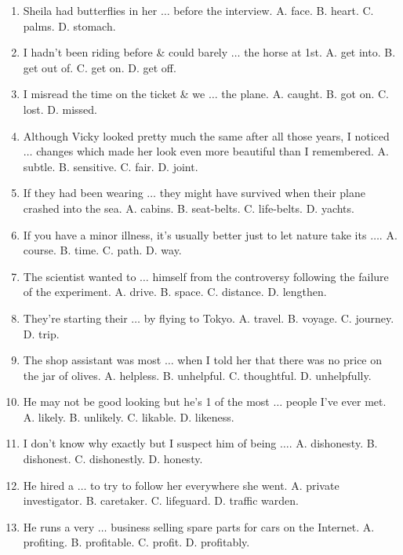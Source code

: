 \documentclass{article}
\numberwithin{equation}{section}
\begin{document}
\begin{enumerate}[leftmargin=8mm]
	\item Sheila had butterflies in her $\ldots$ before the interview. {\sf A.} face. {\sf B.} heart. {\sf C.} palms. {\sf D.} stomach.
	\item I hadn't been riding before \& could barely $\ldots$ the horse at 1st. {\sf A.} get into. {\sf B.} get out of. {\sf C.} get on. {\sf D.} get off.
	\item I misread the time on the ticket \& we $\ldots$ the plane. {\sf A.} caught. {\sf B.} got on. {\sf C.} lost. {\sf D.} missed.
	\item Although Vicky looked pretty much the same after all those years, I noticed $\ldots$ changes which made her look even more beautiful than I remembered. {\sf A.} subtle. {\sf B.} sensitive. {\sf C.} fair. {\sf D.} joint.
	\item If they had been wearing $\ldots$ they might have survived when their plane crashed into the sea. {\sf A.} cabins. {\sf B.} seat-belts. {\sf C.} life-belts. {\sf D.} yachts.
	\item If you have a minor illness, it's usually better just to let nature take its $\ldots$. {\sf A.} course. {\sf B.} time. {\sf C.} path. {\sf D.} way.
	\item The scientist wanted to $\ldots$ himself from the controversy following the failure of the experiment. {\sf A.} drive. {\sf B.} space. {\sf C.} distance. {\sf D.} lengthen.
	\item They're starting their $\ldots$ by flying to Tokyo. {\sf A.} travel. {\sf B.} voyage. {\sf C.} journey. {\sf D.} trip.
	\item The shop assistant was most $\ldots$ when I told her that there was no price on the jar of olives. {\sf A.} helpless. {\sf B.} unhelpful. {\sf C.} thoughtful. {\sf D.} unhelpfully.
	\item He may not be good looking but he's 1 of the most $\ldots$ people I've ever met. {\sf A.} likely. {\sf B.} unlikely. {\sf C.} likable. {\sf D.} likeness.
	\item I don't know why exactly but I suspect him of being $\ldots$. {\sf A.} dishonesty. {\sf B.} dishonest. {\sf C.} dishonestly. {\sf D.} honesty.
	\item He hired a $\ldots$ to try to follow her everywhere she went. {\sf A.} private investigator. {\sf B.} caretaker. {\sf C.} lifeguard. {\sf D.} traffic warden.
	\item He runs a very $\ldots$ business selling spare parts for cars on the Internet. {\sf A.} profiting. {\sf B.} profitable. {\sf C.} profit. {\sf D.} profitably.

\end{enumerate}
\end{document}
